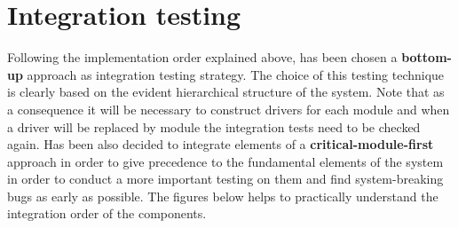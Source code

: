 \documentclass[a4paper]{report}
\begin{document}
\section{Integration testing}
Following the implementation order explained above, has been chosen a \textbf{bottom-up} approach as integration testing strategy. The choice of this testing technique is clearly based on the evident hierarchical structure of the system. Note that as a consequence it will be necessary to construct drivers for each module and when a driver will be replaced by module the integration tests need to be checked again. Has been also decided to integrate elements of a \textbf{critical-module-first} approach in order to give precedence to the fundamental elements of the system in order to conduct a more important testing on them and find system-breaking bugs as early as possible. The figures below helps to practically understand the integration order of the components.\newline
\end{document}
